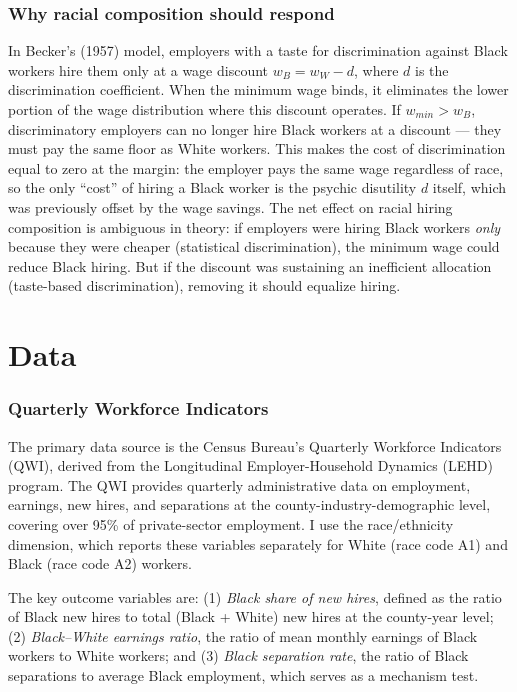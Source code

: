\documentclass[12pt]{article}
\begin{document}
\subsubsection*{Why racial composition should respond}  In Becker's (1957) model, employers with a taste for discrimination against Black workers hire them only at a wage discount $w_B = w_W - d$, where $d$ is the discrimination coefficient. When the minimum wage binds, it eliminates the lower portion of the wage distribution where this discount operates. If $w_{min} > w_B$, discriminatory employers can no longer hire Black workers at a discount --- they must pay the same floor as White workers. This makes the cost of discrimination equal to zero at the margin: the employer pays the same wage regardless of race, so the only ``cost'' of hiring a Black worker is the psychic disutility $d$ itself, which was previously offset by the wage savings. The net effect on racial hiring composition is ambiguous in theory: if employers were hiring Black workers \textit{only} because they were cheaper (statistical discrimination), the minimum wage could reduce Black hiring. But if the discount was sustaining an inefficient allocation (taste-based discrimination), removing it should equalize hiring.


\section{Data}

\subsubsection*{Quarterly Workforce Indicators}  The primary data source is the Census Bureau's Quarterly Workforce Indicators (QWI), derived from the Longitudinal Employer-Household Dynamics (LEHD) program. The QWI provides quarterly administrative data on employment, earnings, new hires, and separations at the county-industry-demographic level, covering over 95\% of private-sector employment. I use the race/ethnicity dimension, which reports these variables separately for White (race code A1) and Black (race code A2) workers.

The key outcome variables are: (1) \textit{Black share of new hires}, defined as the ratio of Black new hires to total (Black + White) new hires at the county-year level; (2) \textit{Black--White earnings ratio}, the ratio of mean monthly earnings of Black workers to White workers; and (3) \textit{Black separation rate}, the ratio of Black separations to average Black employment, which serves as a mechanism test.
\end{document}
